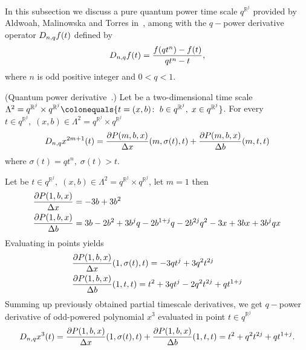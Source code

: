 In this subsection we discuss a pure quantum power time scale $q^{\mathbb{R}^j}$ provided by Aldwoah, Malinowska
and Torres in~\cite{aldwoah2011power}, among with the $q-$power derivative operator $D_{n,q} f(t)$ defined by
\begin{align*}
    D_{n,q} f(t) = \frac{f(qt^n) - f(t)}{qt^n - t},
\end{align*}
where $n$ is odd positive integer and $0 < q < 1$.
\begin{cor}
(Quantum power derivative~\cite{aldwoah2011power}.)
    Let be a two-dimensional time scale
    $\Lambda^2 = q^{\mathbb{R}^j} \times q^{\mathbb{R}^j}
    \colonequals \{t=(x,b) \colon \; b \in q^{\mathbb{R}^j}, \; x \in q^{\mathbb{R}^j} \}$.
    For every $t\in q^{\mathbb{R}^j}, \; (x,b) \in \Lambda^2 = q^{\mathbb{R}^j} \times q^{\mathbb{R}^j}$
    \begin{align*}
        D_{n,q} x^{2m+1} (t)
        = \frac{\partial P ( m, b, x )}{\Delta x} (m, \sigma(t), t)
        + \frac{\partial P ( m, b, x )}{\Delta b} (m, t, t)
    \end{align*}
    where $\sigma(t) = qt^n, \; \sigma(t) > t$.
\end{cor}
\begin{examp}
    \label{time_scale_pure_quantum_power_example_1}
    Let be $t\in q^{\mathbb{R}^j}, \; (x,b) \in\Lambda^2 = q^{\mathbb{R}^j} \times q^{\mathbb{R}^j}$, let $m=1$ then
    \begin{align*}
        &\frac{\partial P ( 1, b, x )}{\Delta x} = -3 b + 3 b^2 \\
        &\frac{\partial P ( 1, b, x )}{\Delta b} = 3 b - 2 b^2 + 3 b^j q - 2 b^{1 + j} q - 2 b^{2 j} q^2 - 3 x + 3 b x + 3 b^j q x
    \end{align*}
    Evaluating in points yields
    \begin{align*}
        &\frac{\partial P ( 1, b, x )}{\Delta x}(1, \sigma(t), t) = -3 q t^j + 3 q^2 t^{2 j} \\
        &\frac{\partial P ( 1, b, x )}{\Delta b}(1, t, t) = t^2 + 3 q t^j - 2 q^2 t^{2 j} + q t^{1 + j}
    \end{align*}
    Summing up previously obtained partial timescale derivatives, we get $q-$power derivative of odd-powered polynomial
    $x^{3}$ evaluated in point $t\in q^{\mathbb{R}^j}$
    \begin{align*}
        D_{n,q} x^{3}(t)
        = \frac{\partial P ( 1, b, x )}{\Delta x} (1, \sigma(t), t)
        + \frac{\partial P ( 1, b, x )}{\Delta b} (1, t, t)
        = t^2 + q^2 t^{2 j} + q t^{1 + j}.
    \end{align*}
\end{examp}

